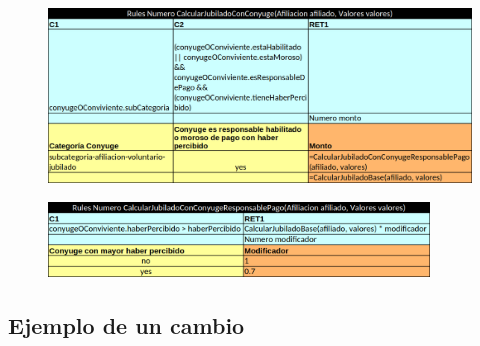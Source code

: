 \documentclass[10pt]{beamer}
\begin{document}
\begin{frame}
    \begin{figure}
        \centering
        \includegraphics[width=\textwidth]{tables/jubiladoConConyuge.png}
    \end{figure}
    \begin{figure}
        \centering
        \includegraphics[width=0.9\textwidth]{tables/jubiladoConConyugeResponsable.png}
    \end{figure}
\end{frame}

\subsection{Ejemplo de un cambio}
\end{document}
